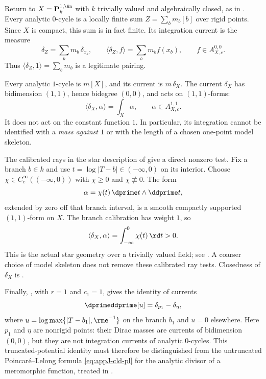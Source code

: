 
\begin{example}
\label{ex:ch14-line-cycles}
Return to $X=\mathbf P^{1,\An}_k$ with $k$ trivially valued and
algebraically closed, as in .  Every analytic
$0$-cycle is a locally finite sum $Z=\sum_bm_b[b]$ over rigid points.
Since $X$ is compact, this sum is in fact finite.  Its integration current
is the measure
\[
 \delta_Z=\sum_bm_b\,\delta_{x_b},\qquad
 \langle\delta_Z,f\rangle=\sum_bm_bf(x_b),
 \qquad f\in A_{X,c}^{0,0}.
\]
Thus $\langle\delta_Z,1\rangle=\sum_bm_b$ is a legitimate pairing.

Every analytic $1$-cycle is $m[X]$, and its current is $m\,\delta_X$.
The current $\delta_X$ has bidimension $(1,1)$, hence bidegree $(0,0)$,
and acts on $(1,1)$-forms:
\[
                 \langle\delta_X,\alpha\rangle=\int_X\alpha,
                         \qquad \alpha\in A_{X,c}^{1,1}.
\]
It does not act on the constant function $1$.  In particular, its
integration cannot be identified with a \emph{mass against $1$} or with the
length of a chosen one-point model skeleton.

The calibrated rays in the star description of
 give a direct nonzero test.  Fix a branch
$b\in k$ and use $t=\log|T-b|\in(-\infty,0)$ on its interior.  Choose
$\chi\in C_c^\infty((-\infty,0))$ with $\chi\ge0$ and $\chi\not\equiv0$.
The form
\[
                        \alpha=\chi(t)\,\dprime t\wedge\ddprime t,
\]
extended by zero off that branch interval, is a smooth compactly
supported $(1,1)$-form on $X$.  The branch calibration has weight $1$, so
\[
                 \langle\delta_X,\alpha\rangle
                     =\int_{-\infty}^{0}\chi(t)\,\rd t>0.
\]
This is the actual star geometry over a trivially valued field;
see \cite[Example~6.7.3]{CLD25}.  A coarser choice of model skeleton
does not remove these calibrated ray tests.  Closedness of $\delta_X$
is .

Finally, , with $r=1$ and $c_1=1$,
gives the identity of currents
\[
                   \dprimeddprime[u]=\delta_{p_1}-\delta_\eta,
\]
where $u=\log\max\{|T-b_1|,\rme^{-1}\}$ on the branch $b_1$ and
$u=0$ elsewhere.  Here $p_1$ and $\eta$ are nonrigid points:
their Dirac masses are currents of bidimension $(0,0)$, but they are
not integration currents of analytic $0$-cycles.  This truncated-potential
identity must therefore be distinguished from the untruncated
Poincar\'e--Lelong formula \eqref{eq:appJ-cld-pl} for the analytic divisor of a meromorphic
function, treated in .
\end{example}

